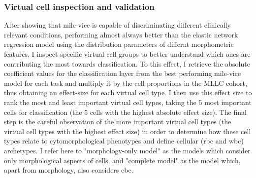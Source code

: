 \begin{figure}[!ht]
    \label{fig:mile-vice-vs-glmnet-scatter}
\end{figure}

\subsubsection{Virtual cell inspection and validation}

After showing that \ac{mile-vice} is capable of discriminating different clinically relevant conditions, performing almost always better than the elastic network regression model using the distribution parameters of differnt morphometric features, I inspect specific virtual cell groups to better understand which ones are contributing the most towards classification. To this effect, I retrieve the absolute coefficient values for the classification layer from the best performing \ac{mile-vice} model for each task and multiply it by the cell proportions in the MLLC cohort, thus obtaining an effect-size for each virtual cell type. I then use this effect size to rank the most and least important virtual cell types, taking the 5 most important cells for classification (the 5 cells with the highest absolute effect size). The final step is the careful observation of the more important virtual cell types (the virtual cell types with the highest effect size) in order to determine how these cell types relate to cytomorphological phenotypes and define cellular (\ac{rbc} and \ac{wbc}) archetypes. I refer here to "morphology-only model" as the models which consider only morphological aspects of cells, and "complete model" as the model which, apart from morphology, also considers \ac{cbc}. 

